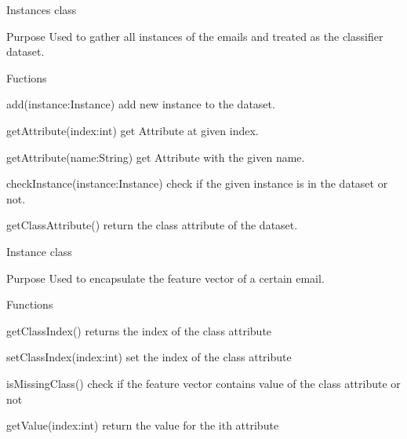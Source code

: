 \documentclass[12pt]{article}
\newenvironment{my_itemize}
{\begin{itemize}
  \setlength{\itemsep}{0cm}
  \setlength{\parskip}{0cm}}
{\end{itemize}}
\newenvironment{my_desc}
{\begin{description}
  \setlength{\itemsep}{0cm}
  \setlength{\parskip}{0cm}}
{\end{description}}
\begin{document}
\begin{my_itemize}
\begin{my_desc}
  \end{my_desc}


  \item Instances class
  \begin{my_desc}
    \item[Purpose] Used to gather all instances of the emails and treated as the classifier
      dataset.
    \item[Fuctions] \hfill
    \begin{my_itemize}
      \item add(instance:Instance) add new instance to the dataset.
      \item getAttribute(index:int) get Attribute at given index.
      \item getAttribute(name:String) get Attribute with the given name.
      \item checkInstance(instance:Instance) check if the given instance is in the dataset or not.
      \item getClassAttribute() return the class attribute of the dataset.
    \end{my_itemize}

  \end{my_desc}

  \item Instance class
  \begin{my_desc}
    \item[Purpose] Used to encapsulate the feature vector of a certain email.
    \item[Functions] \hfill
    \begin{my_itemize}
      \item getClassIndex() returns the index of the class attribute
      \item setClassIndex(index:int) set the index of the class attribute
      \item isMissingClass() check if the feature vector contains value of the class attribute or not
      \item getValue(index:int) return the value for the ith attribute
    \end{my_itemize}

  \end{my_desc}


\end{my_itemize}
\end{document}
